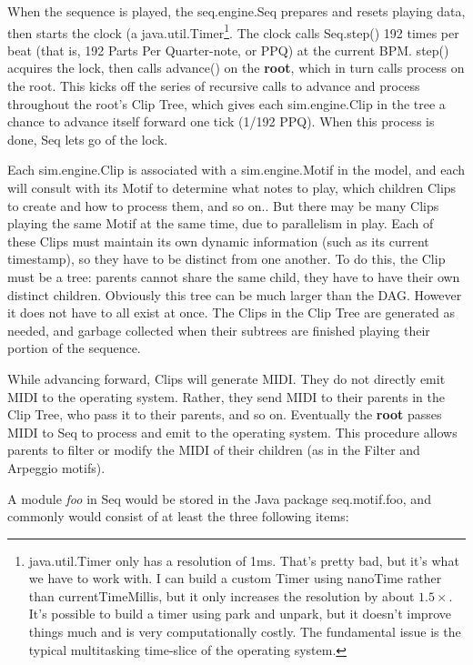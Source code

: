 \documentclass[twoside,10pt]{article}
\begin{document}
When the sequence is played, the {\sf seq.engine.Seq} prepares and resets playing data, then starts the clock (a {\sf java.util.Timer}\footnote{{\sf java.util.Timer} only has a resolution of 1ms.  That's pretty bad, but it's what we have to work with.  I can build a custom Timer using nanoTime rather than currentTimeMillis, but it only increases the resolution by about \(1.5\times\).  It's possible to build a timer using park and unpark, but it doesn't improve things much and is very computationally costly.  The fundamental issue is the typical multitasking time-slice of the operating system.}.  The clock calls {\sf Seq.step()} 192 times per beat (that is, 192 Parts Per Quarter-note, or PPQ) at the current BPM. {\sf step()} acquires the lock, then calls {\sf advance()} on the {\bf root}, which in turn calls {\sf process} on the root.  This kicks off the series of recursive calls to {\sf advance} and {\sf process} throughout the root's Clip Tree, which gives each {\sf sim.engine.Clip} in the tree a chance to advance itself forward one tick (1/192 PPQ).  When this process is done, Seq lets go of the lock.

Each {\sf sim.engine.Clip} is associated with a {\sf sim.engine.Motif} in the model, and each will consult with its Motif to determine what notes to play, which children Clips to create and how to process them, and so on..  But there may be many Clips playing the same Motif at the same time, due to parallelism in play.  Each of these Clips must maintain its own dynamic information (such as its current timestamp), so they have to be distinct from one another.  To do this, the Clip must be a tree: parents cannot share the same child, they have to have their own distinct children.  Obviously this tree can be much larger than the DAG.  However it does not have to all exist at once.  The Clips in the Clip Tree are generated as needed, and garbage collected when their subtrees are finished playing their portion of the sequence.  

While advancing forward, Clips will generate MIDI.  They do not directly emit MIDI to the operating system.  Rather, they send MIDI to their parents in the Clip Tree, who pass it to their parents, and so on.  Eventually the {\bf root} passes MIDI to Seq to process and emit to the operating system.  This procedure allows parents to filter or modify the MIDI of their children (as in the Filter and Arpeggio motifs).

A module {\it foo} in Seq would be stored in the Java package {\sf seq.motif.foo}, and commonly would consist of at least the three following items:
\end{document}
